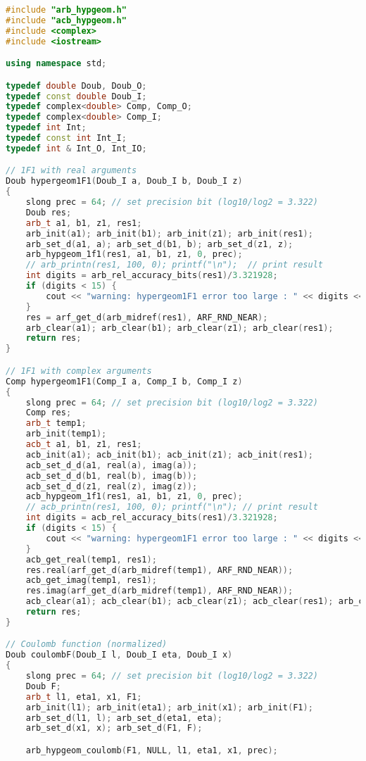 \begin{lstlisting}[language=cpp]
#include "arb_hypgeom.h"
#include "acb_hypgeom.h"
#include <complex>
#include <iostream>

using namespace std;

typedef double Doub, Doub_O;
typedef const double Doub_I;
typedef complex<double> Comp, Comp_O;
typedef complex<double> Comp_I;
typedef int Int;
typedef const int Int_I;
typedef int & Int_O, Int_IO;

// 1F1 with real arguments
Doub hypergeom1F1(Doub_I a, Doub_I b, Doub_I z)
{
	slong prec = 64; // set precision bit (log10/log2 = 3.322)
	Doub res;
	arb_t a1, b1, z1, res1;
	arb_init(a1); arb_init(b1); arb_init(z1); arb_init(res1);
	arb_set_d(a1, a); arb_set_d(b1, b);	arb_set_d(z1, z);
	arb_hypgeom_1f1(res1, a1, b1, z1, 0, prec);
	// arb_printn(res1, 100, 0); printf("\n");  // print result
	int digits = arb_rel_accuracy_bits(res1)/3.321928;
	if (digits < 15) {
		cout << "warning: hypergeom1F1 error too large : " << digits << " digits" << endl;
	}
	res = arf_get_d(arb_midref(res1), ARF_RND_NEAR);
	arb_clear(a1); arb_clear(b1); arb_clear(z1); arb_clear(res1);
	return res;
}

// 1F1 with complex arguments
Comp hypergeom1F1(Comp_I a, Comp_I b, Comp_I z)
{
	slong prec = 64; // set precision bit (log10/log2 = 3.322)
	Comp res;
	arb_t temp1;
	arb_init(temp1);
	acb_t a1, b1, z1, res1;
	acb_init(a1); acb_init(b1); acb_init(z1); acb_init(res1);
	acb_set_d_d(a1, real(a), imag(a));
	acb_set_d_d(b1, real(b), imag(b));
	acb_set_d_d(z1, real(z), imag(z));
	acb_hypgeom_1f1(res1, a1, b1, z1, 0, prec);
	// acb_printn(res1, 100, 0); printf("\n"); // print result
	int digits = acb_rel_accuracy_bits(res1)/3.321928;
	if (digits < 15) {
		cout << "warning: hypergeom1F1 error too large : " << digits << " digits" << endl;
	}
	acb_get_real(temp1, res1);
	res.real(arf_get_d(arb_midref(temp1), ARF_RND_NEAR));
	acb_get_imag(temp1, res1);
	res.imag(arf_get_d(arb_midref(temp1), ARF_RND_NEAR));
	acb_clear(a1); acb_clear(b1); acb_clear(z1); acb_clear(res1); arb_clear(temp1);
	return res;
}

// Coulomb function (normalized)
Doub coulombF(Doub_I l, Doub_I eta, Doub_I x)
{
	slong prec = 64; // set precision bit (log10/log2 = 3.322)
	Doub F;
	arb_t l1, eta1, x1, F1;
	arb_init(l1); arb_init(eta1); arb_init(x1); arb_init(F1);
	arb_set_d(l1, l); arb_set_d(eta1, eta);
	arb_set_d(x1, x); arb_set_d(F1, F);

	arb_hypgeom_coulomb(F1, NULL, l1, eta1, x1, prec);
	

\end{lstlisting}

